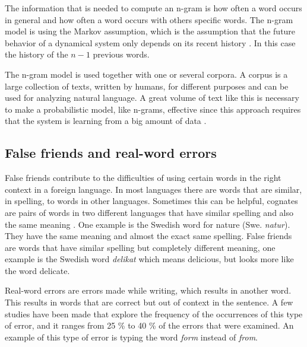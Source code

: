 \documentclass[a4paper,12pt]{article}
\begin{document}
The information that is needed to compute an n-gram is how often a word occurs in general and how often a word occurs with others specific words. The n-gram model is using the Markov assumption, which is the assumption that the future behavior of a dynamical system only depends on its recent history \cite{mooneynatural}. In this case the history of the $n-1$ previous words. 

The n-gram model is used together with one or several corpora. A corpus is a large collection of texts, written by humans, for different purposes and can be used for analyzing natural language. A great volume of text like this is necessary to make a probabilistic model, like n-grams, effective since this approach requires that the system is learning from a big amount of data \cite{RussellNorvigAIBook}.

\subsection{False friends and real-word errors}
False friends contribute to the difficulties of using certain words in the right context in a foreign language. In most languages there are words that are similar, in spelling, to words in other languages. Sometimes this can be helpful, cognates are pairs of words in two different languages that have similar spelling and also the same meaning \cite{frunza2006automatic}. One example is the Swedish word for nature (Swe. \emph{natur}). They have the same meaning and almost the exact same spelling. False friends are words that have similar spelling but completely different meaning, one example is the Swedish word \emph{delikat} which means delicious, but looks more like the word delicate.

Real-word errors are errors made while writing, which results in another word. This results in words that are correct but out of context in the sentence. A few studies have been made that explore the frequency of the occurrences of this type of error, and it ranges from 25 \% to 40 \% of the errors that were examined. An example of this type of error is typing the word \emph{form} instead of \emph{from}.\cite{kukich1992techniques}
\end{document}
